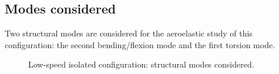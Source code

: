 
\subsection{Modes considered}
\label{sub:dream_ls_modes_considered}

Two structural modes are considered for the aeroelastic study of this 
configuration: the second bending/flexion mode and the first torsion mode.
\begin{figure}[htb]
  \centering
  \caption{Low-speed isolated configuration: structural modes considered.}
  \label{fig:dream_ls_ael_modes}
\end{figure}

